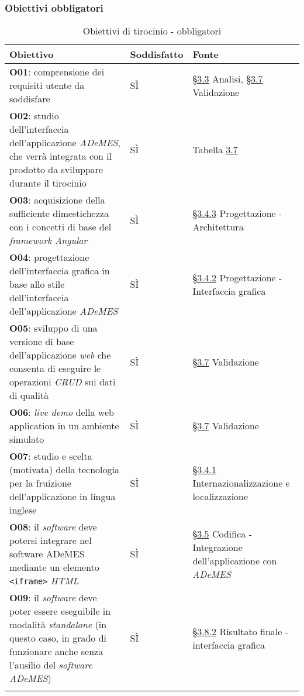 \subsubsection*{Obiettivi obbligatori}
\begin{longtable}{>{\centering\arraybackslash}m{}>{\centering\arraybackslash}m{}>{\centering\arraybackslash}m{}}
    \hline
    \rowcolor{black}
    \color{white}\textbf{Obiettivo} & \color{white}\textbf{Soddisfatto} & \color{white}\textbf{Fonte} \\
    \hline
    \endhead %
    \textbf{O01}: comprensione dei requisiti utente da soddisfare & SÌ & \hyperref[sec:analisi]{§3.3} Analisi, \hyperref[sec:validazione]{§3.7} Validazione \\
    \hline
    \textbf{O02}: studio dell’interfaccia dell’applicazione \textit{ADeMES}, che verrà integrata con il prodotto da sviluppare durante il tirocinio & SÌ & Tabella \hyperref[tab:colors]{3.7} \\
    \hline
    \textbf{O03}: acquisizione della sufficiente dimestichezza con i concetti di base del \textit{framework Angular} & SÌ & \hyperref[subsec:architettura]{§3.4.3} Progettazione - Architettura \\
    \hline
    \textbf{O04}: progettazione dell'interfaccia grafica in base allo stile dell'interfaccia dell'applicazione \textit{ADeMES} & SÌ & \hyperref[subsec:interfaccia]{§3.4.2} Progettazione - Interfaccia grafica  \\
    \hline
    \textbf{O05}: sviluppo di una versione di base dell'applicazione \textit{web} che consenta di eseguire le operazioni \textit{CRUD} sui dati di qualità & SÌ & \hyperref[sec:validazione]{§3.7} Validazione \\
    \hline
    \textbf{O06}: \textit{live demo} della web application in un ambiente simulato & SÌ & \hyperref[sec:validazione]{§3.7} Validazione \\
    \hline
    \textbf{O07}: studio e scelta (motivata) della tecnologia per la fruizione dell'applicazione in lingua inglese & SÌ & \hyperref[subsec:internazionalizzazione]{§3.4.1} Internazionalizzazione e localizzazione \\
    \hline
    \textbf{O08}: il \textit{software} deve potersi integrare nel software ADeMES mediante un elemento \texttt{<iframe>} \textit{HTML} & SÌ & \hyperref[subsec:integrazione]{§3.5} Codifica - Integrazione dell'applicazione con \textit{ADeMES}\\
    \hline
    \textbf{O09}: il \textit{software} deve poter essere eseguibile in modalità \textit{standalone} (in questo caso, in grado di funzionare anche senza l'ausilio del \textit{software ADeMES}) & SÌ & \hyperref[subsec:interfaccia-risultato]{§3.8.2} Risultato finale - interfaccia grafica \\
    \hline
    \caption{Obiettivi di tirocinio - obbligatori}
\end{longtable}

